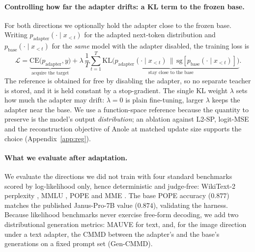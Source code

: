 \documentclass{article}
\begin{document}
\paragraph{Controlling how far the adapter drifts: a KL term to the frozen base.}
For both directions we optionally hold the adapter close to the frozen base.
Writing $p_{\text{adapter}}(\cdot\mid x_{<t})$ for the adapted next-token
distribution and $p_{\text{base}}(\cdot\mid x_{<t})$ for the \emph{same} model
with the adapter disabled, the training loss is
\begin{equation}
\mathcal{L}=\underbrace{\mathrm{CE}\big(p_{\text{adapter}},y\big)}_{\text{acquire the target}}
+\lambda\,\frac{1}{T}\sum_{t=1}^{T}\underbrace{\mathrm{KL}\!\big(p_{\text{adapter}}(\cdot\mid x_{<t})\,\big\|\,\mathrm{sg}[p_{\text{base}}(\cdot\mid x_{<t})]\big)}_{\text{stay close to the base}} .
\label{eq:kl}
\end{equation}
The reference is obtained for free by disabling the adapter, so no separate
teacher is stored, and it is held constant by a stop-gradient. The single KL
weight $\lambda$ sets how much the adapter may drift: $\lambda=0$ is plain
fine-tuning, larger $\lambda$ keeps the adapter near the base. We use a
function-space reference because the quantity to preserve is the model's output
\emph{distribution}; an ablation against L2-SP, logit-MSE and the reconstruction
objective of Anole \citep{chern2024anole} at matched update size supports the
choice (Appendix~\ref{app:reg}).

\paragraph{What we evaluate after adaptation.}
We evaluate the directions we did not train with four standard benchmarks scored
by log-likelihood only, hence deterministic and judge-free: WikiText-2 perplexity
\citep{wikitext}, MMLU \citep{mmlu}, POPE \citep{pope} and MME \citep{mme}. The
base POPE accuracy ($0.877$) matches the published Janus-Pro-7B value ($0.874$),
validating the harness. Because likelihood benchmarks never exercise free-form
decoding, we add two distributional generation metrics: MAUVE
\citep{pillutla2021mauve} for text, and, for the image direction under a text
adapter, the CMMD \citep{cmmd} between the adapter's and the base's generations
on a fixed prompt set (Gen-CMMD).
\end{document}
